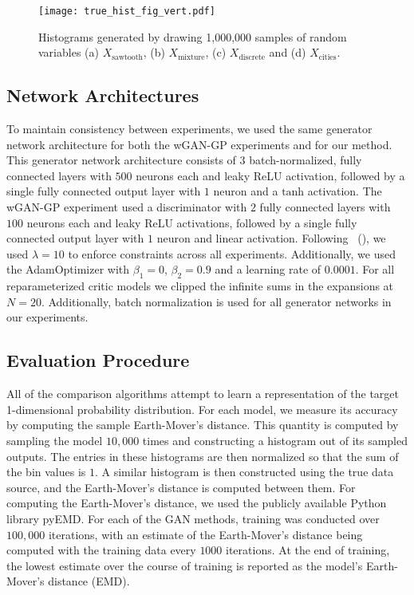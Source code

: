 \documentclass[letterpaper]{article} %
\newcommand{\namecite}[1]{\citeauthor{#1}~(\citeyear{#1})}
\begin{document}
\begin{figure}
    \centering
    \texttt{[image: true\_hist\_fig\_vert.pdf]}
    \caption{Histograms generated by drawing 1,000,000 samples of random variables (a) $X_\text{sawtooth}$, (b) $X_\text{mixture}$, (c) $X_\text{discrete}$ and (d) $X_\text{cities}$.}
    \label{fig:true_histograms}
\end{figure}

\subsection{Network Architectures}

To maintain consistency between experiments, we used the same generator network architecture for both the wGAN-GP experiments and for our method. This generator network architecture consists of $3$ batch-normalized, fully connected layers with $500$ neurons each and leaky ReLU activation, followed by a single fully connected output layer with $1$ neuron and a $\text{tanh}$ activation. The wGAN-GP experiment used a discriminator with $2$ fully connected layers with $100$ neurons each and leaky ReLU activations, followed by a single fully connected output layer with $1$ neuron and linear activation. Following \namecite{Gulrajani2017ImprovedTO}, we used $\lambda = 10$ to enforce constraints across all experiments. Additionally, we used the AdamOptimizer \cite{Kingma2014AdamAM} with $\beta_1 = 0$, $\beta_2 = 0.9$ and a learning rate of $0.0001$. For all reparameterized critic models we clipped the infinite sums in the expansions at $N = 20$. Additionally, batch normalization \cite{Ioffe2015BatchNA} is used for all generator networks in our experiments.

\subsection{Evaluation Procedure}

All of the comparison algorithms attempt to learn a representation of the target 1-dimensional probability distribution. For each model, we measure its accuracy by computing the sample Earth-Mover's distance. This quantity is computed by sampling the model $10,000$ times and constructing a histogram out of its sampled outputs. The entries in these histograms are then normalized so that the sum of the bin values is $1$. A similar histogram is then constructed using the true data source, and the Earth-Mover's distance is computed between them. For computing the Earth-Mover's distance, we used the publicly available Python library pyEMD.
For each of the GAN methods, training was conducted over $100,000$ iterations, with an estimate of the Earth-Mover's distance being computed with the training data every $1000$ iterations. At the end of training, the lowest estimate over the course of training is reported as the model's Earth-Mover's distance (EMD).
\end{document}
